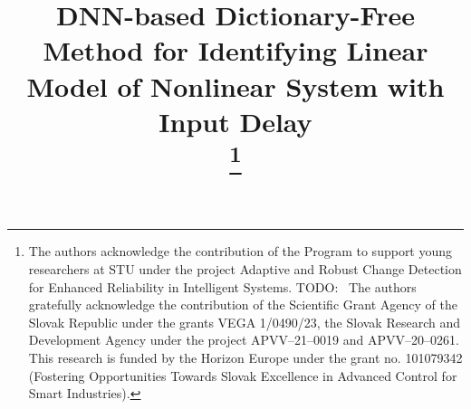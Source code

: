 \documentclass[conference]{IEEEtran}
\newcommand{\todo}[1]{{{\color{red} TODO:~#1	}} }
\begin{document}
\title{DNN-based Dictionary-Free Method for Identifying Linear Model of Nonlinear System with Input Delay\\

    \thanks{The authors acknowledge the contribution of the Program to support young researchers at STU under the project Adaptive and Robust Change Detection for Enhanced Reliability in Intelligent Systems.\todo{ The authors gratefully acknowledge the contribution of the Scientific Grant Agency of the Slovak Republic under the grants VEGA 1/0490/23, the Slovak Research and Development Agency under the project APVV--21--0019 and APVV--20--0261.} This research is funded by the Horizon Europe under the grant no. 101079342 (Fostering Opportunities Towards Slovak Excellence in Advanced Control for Smart Industries).}
}

\author{
}

\maketitle
\end{document}
